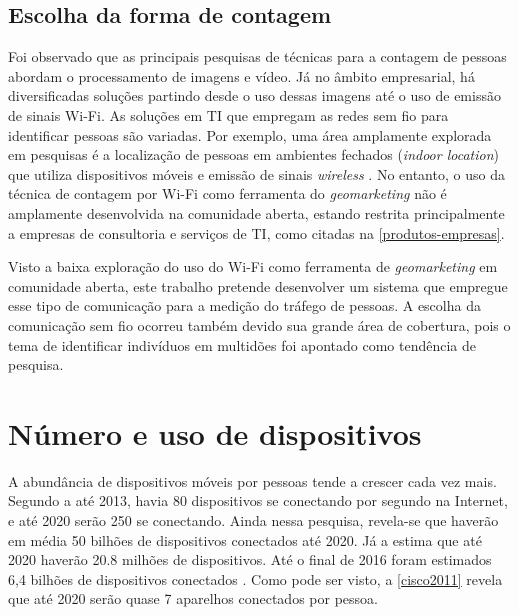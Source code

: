 \subsection{Escolha da forma de contagem}
Foi observado que as principais pesquisas de técnicas para a contagem de pessoas abordam o processamento de imagens e vídeo. Já no âmbito empresarial,
há diversificadas soluções partindo desde o uso dessas imagens até o uso de emissão de sinais Wi-Fi.
As soluções em TI que empregam as redes sem fio para identificar pessoas são variadas. Por exemplo,
uma área amplamente explorada em pesquisas é a localização de pessoas em
ambientes fechados (\emph{indoor location}) que utiliza dispositivos móveis e emissão de sinais \emph{wireless} \cite{Ferreira2016}
\cite{Puhl2016} \cite{Figuera2011}. No entanto, o uso da técnica de contagem por Wi-Fi como ferramenta do \emph{geomarketing} não
é amplamente desenvolvida na comunidade aberta, estando restrita principalmente a empresas de consultoria e serviços de TI, como citadas
na \autoref{produtos-empresas}.

Visto a baixa exploração do uso do Wi-Fi como ferramenta de \emph{geomarketing} em comunidade aberta, este trabalho pretende
desenvolver um sistema que empregue esse tipo de comunicação para a medição do tráfego de pessoas. A escolha da comunicação
sem fio ocorreu também devido sua grande área de cobertura, pois o tema de identificar indivíduos
em multidões foi apontado como tendência de pesquisa.


\section{Número e uso de dispositivos}

A abundância de dispositivos móveis por pessoas tende a crescer cada vez mais. Segundo a  até 2013, havia 80 dispositivos
se conectando por segundo na Internet, e até 2020 serão 250 se conectando. Ainda nessa pesquisa, revela-se que haverão em média
50 bilhões de dispositivos conectados até 2020. Já a  estima que até 2020 haverão 20.8 milhões de dispositivos.
Até o final de 2016 foram estimados 6,4 bilhões de dispositivos conectados \cite{Gartner2014}. Como pode ser visto, a \autoref{cisco2011}
revela que até 2020 serão quase 7 aparelhos conectados por pessoa.

